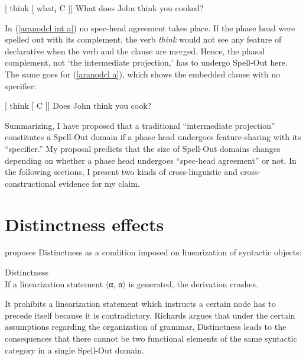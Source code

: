 \documentclass[output=paper]{langscibook}
\begin{document}
\ea 
\ea 
\label{aranodcl int a} {} \textup{
 [ think [ what$_\mathrm{i}$ C ]]
  }  
\ex What does John think you cooked? \label{aranodcl int b}  
\z 
\z 

\noindent In (\ref{aranodcl int a}) no spec-head agreement takes place. If the phase head were spelled out with its complement, the verb \emph{think} would not see any feature of declarative when the verb and the clause are merged. Hence, the phasal complement, not `the intermediate projection,' has to undergo Spell-Out here. The same goes for (\ref{aranodcl a}), which shows the embedded clause with no specifier:

\ea 
\ea 
\label{aranodcl a} {} \textup{
 [ think [ C ]]
  }  
\ex Does John think you cook?
\z 
\z 

Summarizing, I have proposed that a traditional ``intermediate projection'' constitutes a Spell-Out domain if a phase head undergoes feature-sharing with its ``specifier.'' My proposal predicts that the size of Spell-Out domains changes depending on whether a phase head undergoes  ``spec-head agreement'' or not. In the following sections, I present two kinds of cross-linguistic and cross-construc\-tional evidence for my claim.


\section{Distinctness effects}\label{aranosect3}
\citet{Richards:2010} proposes Distinctness as a condition imposed on linearization of syntactic objects:

\ea\upshape
Distinctness\\
If a linearization statement 〈α, α〉 is generated, the derivation crashes.
\z 

\noindent It prohibits a linearization statement which instructs a  certain node has to precede itself because it is contradictory. Richards argues that under the certain assumptions regarding the organization of grammar, Distinctness leads to the consequences that there cannot be two functional elements of the same syntactic category in a single Spell-Out domain. 
\end{document}
